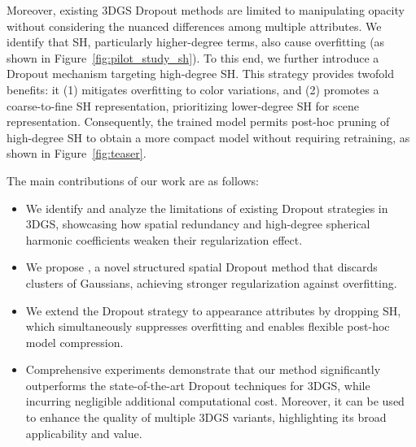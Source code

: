 Moreover, existing 3DGS Dropout methods are limited to manipulating opacity without considering the nuanced differences among multiple attributes. 
%
We identify that SH, particularly higher-degree terms, also cause overfitting (as shown in Figure~\ref{fig:pilot_study_sh}). To this end, we further introduce a Dropout mechanism targeting high-degree SH. 
%
This strategy provides twofold benefits: it (1) mitigates overfitting to color variations, and (2) promotes a coarse-to-fine SH representation, prioritizing lower-degree SH for scene representation. 
%
Consequently, the trained model permits post-hoc pruning of high-degree SH to obtain a more compact model without requiring retraining, as shown in Figure~\ref{fig:teaser}.



The main contributions of our work are as follows: 
\begin{itemize}
\item We identify and analyze the limitations of existing Dropout strategies in 3DGS, showcasing how spatial redundancy and high-degree spherical harmonic coefficients weaken their regularization effect.
\item We propose \methodname{}, a novel structured spatial Dropout method that discards clusters of Gaussians, achieving stronger regularization against overfitting.
\item We extend the Dropout strategy to appearance attributes by dropping SH, which simultaneously suppresses overfitting and enables flexible post-hoc model compression.
\item Comprehensive experiments demonstrate that our method significantly outperforms the state-of-the-art Dropout techniques for 3DGS, while incurring negligible additional computational cost. Moreover, it can be used to enhance the quality of multiple 3DGS variants, highlighting its broad applicability and value.
\end{itemize}





